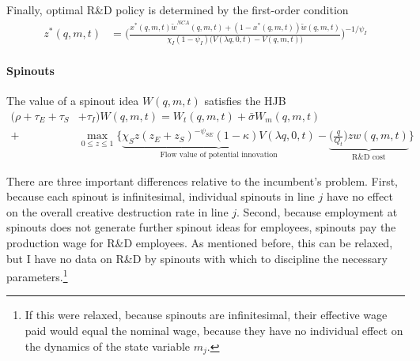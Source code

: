 \documentclass[12pt,english]{article}
\theoremstyle{remark}
\begin{document}
Finally, optimal R\&D policy is determined by the first-order condition
\begin{align}
	z^*(q,m,t) &= \Bigg( \frac{x^*(q,m,t) \tilde{w}^{NCA}(q,m,t) + (1-x^*(q,m,t))\tilde{w}(q,m,t)}{\chi_I(1-\psi_I) \Big(V(\lambda q, 0, t) - V(q,m,t) \Big)}\Bigg)^{-1/\psi_I}
\end{align}

\paragraph{Spinouts}

The value of a spinout idea $W(q,m,t)$ satisfies the HJB
\begin{align}
(\rho  + \tau_E + \tau_S& + \tau_I)W(q,m,t) = W_t(q,m,t) + \bar{\sigma}W_m(q,m,t) \nonumber \\
+& \max_{0 \le z \le 1} \Big\{ \underbrace{\chi_S z (z_E + z_S)^{-\psi_{SE}} (1-\kappa) V(\lambda q,0,t)}_{\textrm{Flow value of potential innovation}} - \underbrace{\Big(\frac{q}{Q_t}\Big) z w(q,m,t)}_{\textrm{R\&D cost}} \Big\} \label{HJB_S}
\end{align}

There are three important differences relative to the incumbent's problem. First, because each spinout is infinitesimal, individual spinouts in line $j$ have no effect on the overall creative destruction rate in line $j$. Second, because employment at spinouts does not generate further spinout ideas for employees, spinouts pay the production wage for R\&D employees. As mentioned before, this can be relaxed, but I have no data on R\&D by spinouts with which to discipline the necessary parameters.\footnote{If this were relaxed, because spinouts are infinitesimal, their effective wage paid would equal the nominal wage, because they have no individual effect on the dynamics of the state variable $m_j$.} 
\end{document}

